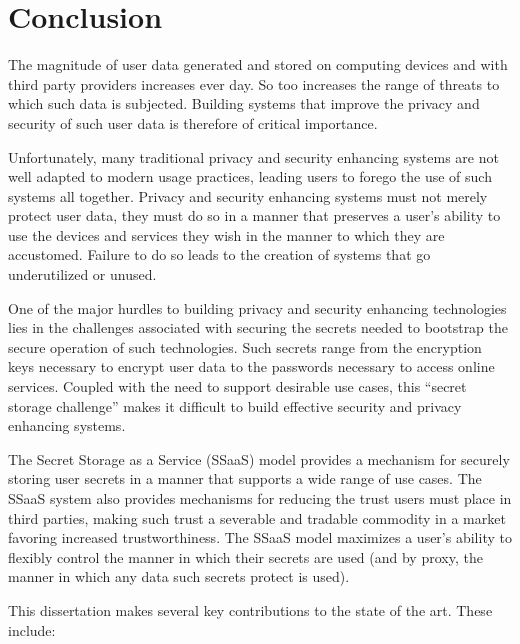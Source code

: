 \chapter{Conclusion}
\label{chap:conclusion}

The magnitude of user data generated and stored on computing devices
and with third party providers increases ever day. So too increases
the range of threats to which such data is subjected.  Building
systems that improve the privacy and security of such user data is
therefore of critical importance.

Unfortunately, many traditional privacy and security enhancing systems
are not well adapted to modern usage practices, leading users to
forego the use of such systems all together. Privacy and security
enhancing systems must not merely protect user data, they must do so
in a manner that preserves a user's ability to use the devices and
services they wish in the manner to which they are accustomed. Failure
to do so leads to the creation of systems that go underutilized or
unused.

One of the major hurdles to building privacy and security enhancing
technologies lies in the challenges associated with securing the
secrets needed to bootstrap the secure operation of such
technologies. Such secrets range from the encryption keys necessary to
encrypt user data to the passwords necessary to access online
services. Coupled with the need to support desirable use cases, this
``secret storage challenge'' makes it difficult to build effective
security and privacy enhancing systems.

The Secret Storage as a Service (SSaaS) model provides a mechanism for
securely storing user secrets in a manner that supports a wide range
of use cases. The SSaaS system also provides mechanisms for reducing
the trust users must place in third parties, making such trust a
severable and tradable commodity in a market favoring increased
trustworthiness. The SSaaS model maximizes a user's ability to
flexibly control the manner in which their secrets are used (and by
proxy, the manner in which any data such secrets protect is used).

This dissertation makes several key contributions to the state of the
art. These include:

